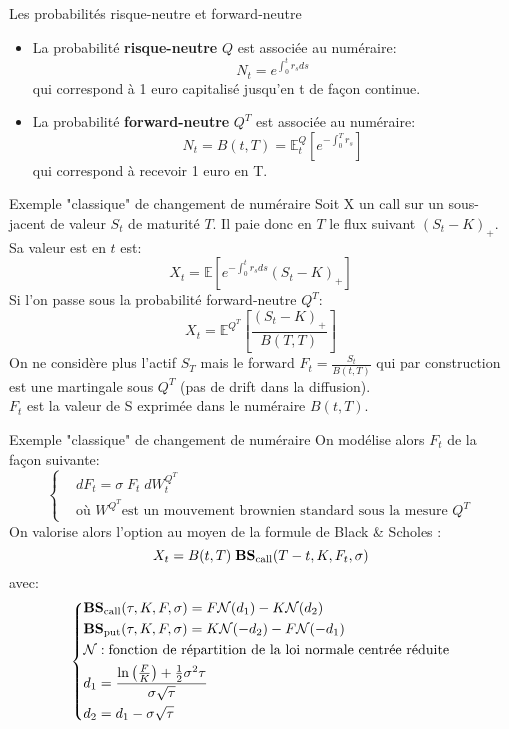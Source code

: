 \documentclass{beamer}
\begin{document}
\begin{frame}{Les probabilités risque-neutre et forward-neutre}
\begin{itemize}
\item La probabilité \textbf{risque-neutre} $Q$ est associée au numéraire:
\[
N_t=e^{\int_0^t r_s ds }
\]
qui correspond à 1 euro capitalisé jusqu'en t de façon continue.
\vspace{0.5cm}\\
\item La probabilité \textbf{forward-neutre} $Q^T$ est associée au numéraire:
\[
N_t=B(t,T)=\mathbb{E}^Q_t[e^{-\int_0^T r_s}]
\]
qui correspond à recevoir 1 euro en T.
\end{itemize}

\end{frame}

\begin{frame}{Exemple "classique" de changement de numéraire}
Soit X un call sur un sous-jacent de valeur $S_t$ de maturité $T$. Il paie donc en $T$ le flux suivant $(S_t-K)_+$.\\
Sa valeur est en $t$ est:
\[
X_t=\mathbb{E}[e^{-\int_0^t r_s ds}(S_t-K)_+]
\]
Si l'on passe sous la probabilité forward-neutre $Q^T$:
\[
X_t=\mathbb{E}^{Q^T}\left[\frac{(S_t-K)_+}{B(T,T)}\right]
\]
On ne considère plus l'actif $S_T$ mais le forward $F_t=\frac{S_t}{B(t,T)}$  qui par construction est une martingale sous $Q^T$ (pas de drift dans la diffusion).\\
$F_t$ est la valeur de S exprimée dans le numéraire $B(t,T)$.
\end{frame}
\begin{frame}{Exemple "classique" de changement de numéraire}
On modélise alors $F_t$ de la façon suivante:
\[
\left\{
\begin{split}
&dF_t=\sigma\; F_t \;dW_t^{Q^T}\\
&\text{où } W^{Q^T}\text{est un mouvement brownien standard sous la mesure }Q^T
\end{split}
\right.
\]
On valorise alors l'option au moyen de la formule de Black \& Scholes :
\[
X_t=B(t,T)\;\text{\textbf{BS}}_\text{call}(T-t,K,F_t,\sigma)
\]
avec:
\[
\left\{
\begin{split}
&\text{\textbf{BS}}_\text{call}(\tau,K,F,\sigma)=F\mathcal{N}(d_1)-K \mathcal{N}(d_2)\\
&\text{\textbf{BS}}_\text{put}(\tau,K,F,\sigma)=K\mathcal{N}(-d_2)-F \mathcal{N}(-d_1)\\
&\mathcal{N} : \text{fonction de répartition de la loi normale centrée réduite}\\
&d_1=\frac{\ln\left(\frac{F}{K}\right)+\frac{1}{2}\sigma^2\tau}{\sigma\sqrt{\tau}}\\
&d_2=d_1-\sigma\sqrt{\tau}
\end{split}
\right.
\]
\end{frame}
\end{document}
